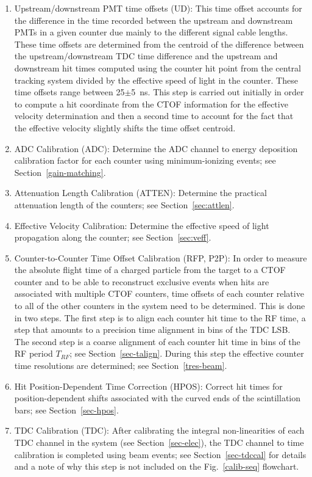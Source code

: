 \documentclass[3p,times,twocolumn]{elsarticle}
\begin{document}
\begin{enumerate}
\item Upstream/downstream PMT time offsets (UD): This time offset accounts for the difference in the
time recorded between the upstream and downstream PMTs in a given counter due mainly to the different
signal cable lengths. These time offsets are determined from the centroid of the difference between the
upstream/downstream TDC time difference and the upstream and downstream hit times computed using the
counter hit point from the central tracking system divided by the effective speed of light in the counter.
These time offsets range between 25$\pm$5~ns. This step is carried out initially in order to compute a hit
coordinate from the CTOF information for the effective velocity determination and then a second time to
account for the fact that the effective velocity slightly shifts the time offset centroid.

\item ADC Calibration (ADC): Determine the ADC channel to energy deposition calibration factor for each
counter using minimum-ionizing events; see Section~\ref{gain-matching}.

\item Attenuation Length Calibration (ATTEN): Determine the practical attenuation length of the counters;
see Section~\ref{sec:attlen}.

\item Effective Velocity Calibration: Determine the effective speed of light propagation along the
counter; see Section~\ref{sec:veff}.

\item Counter-to-Counter Time Offset Calibration (RFP, P2P): In order to measure the absolute flight time
of a charged particle from the target to a CTOF counter and to be able to reconstruct exclusive events
when hits are associated with multiple CTOF counters, time offsets of each counter relative to all of the
other counters in the system need to be determined. This is done in two steps. The first step is to align each
counter hit time to the RF time, a step that amounts to a precision time alignment in bins of the TDC LSB. The
second step is a coarse alignment of each counter hit time in bins of the RF period $T_{RF}$; see
Section~\ref{sec-talign}. During this step the effective counter time resolutions are determined; see
Section~\ref{tres-beam}.

\item Hit Position-Dependent Time Correction (HPOS): Correct hit times for position-dependent shifts
associated with the curved ends of the scintillation bars; see Section~\ref{sec-hpos}.

\item TDC Calibration (TDC): After calibrating the integral non-linearities of each TDC channel in the system
(see Section~\ref{sec-elec}), the TDC channel to time calibration is completed using beam events; see
Section~\ref{sec-tdccal} for details and a note of why this step is not included on the Fig.~\ref{calib-seq}
flowchart.

\end{enumerate}
\end{document}
